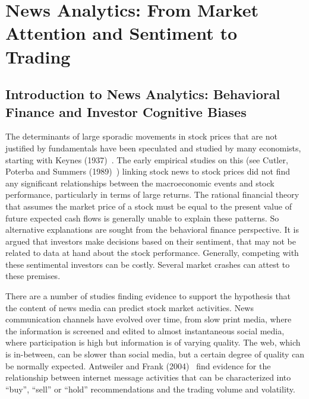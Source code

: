 \chapter{News Analytics: From Market Attention and Sentiment to Trading \label{chap:ch_news_an}}
\section{Introduction to News Analytics: Behavioral Finance and Investor Cognitive Biases}
 
 The determinants of large sporadic movements in stock prices that are not justified by fundamentals have been speculated and studied by many economists, starting with Keynes (1937)~\cite{keynes1937general}. The early empirical studies on this (see Cutler, Poterba and Summers (1989)~\cite{cutler1988moves}) linking stock news to stock prices did not find any significant relationships between the macroeconomic events and stock performance, particularly in terms of large returns. The rational financial theory that assumes the market price of a stock must be equal to the present value of future expected cash flows is generally unable to explain these patterns. So alternative explanations are sought from the behavioral finance perspective. It is argued that investors make decisions based on their sentiment, that may not be related to data at hand about the stock performance. Generally, competing with these sentimental investors can be costly. Several market crashes can attest to these premises.
 
 
 There are a number of studies finding evidence to support the hypothesis that the content of news media can predict stock market activities. News communication channels have evolved over time, from slow print media, where the information is screened and edited to almost instantaneous social media, where participation is high but information is of varying quality. The web, which is in-between, can be slower than social media, but a certain degree of quality can be normally expected. Antweiler and Frank (2004)~\cite{antweiler2004all} find evidence for the relationship between internet message activities that can be characterized into ``buy'', ``sell'' or ``hold'' recommendations and the trading volume and volatility.
 
